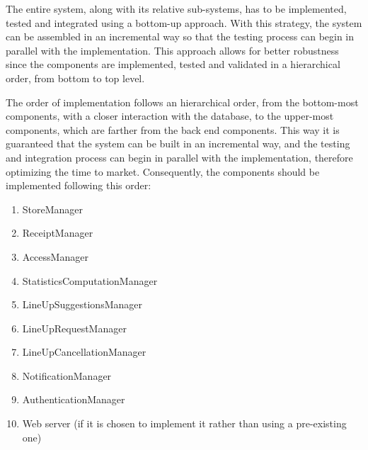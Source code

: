 \documentclass[../../main.tex]{subfiles}
\begin{document}
The entire system, along with its relative sub-systems, has to be implemented, tested and integrated using a bottom-up approach. 
With this strategy, the system can be assembled in an incremental way so that the testing process can begin in parallel with the implementation. 
This approach allows for better robustness since the components are implemented, tested and validated in a hierarchical order, from bottom to top level.


The order of implementation follows an hierarchical order, from the bottom-most components, with a closer interaction with the database, to the upper-most components, which are farther from the back end components. 
This way it is guaranteed that the system can be built in an incremental way, and the testing and integration process can begin in parallel with the implementation, therefore optimizing the time to market. 
Consequently, the components should be implemented following this order:

\begin{enumerate}

	\item StoreManager
	\item ReceiptManager
	\item AccessManager
	\item StatisticsComputationManager
	\item LineUpSuggestionsManager
	\item LineUpRequestManager
	\item LineUpCancellationManager
	\item NotificationManager
	\item AuthenticationManager
	\item Web server (if it is chosen to implement it rather than using a pre-existing one)

\end{enumerate}

\end{document}
